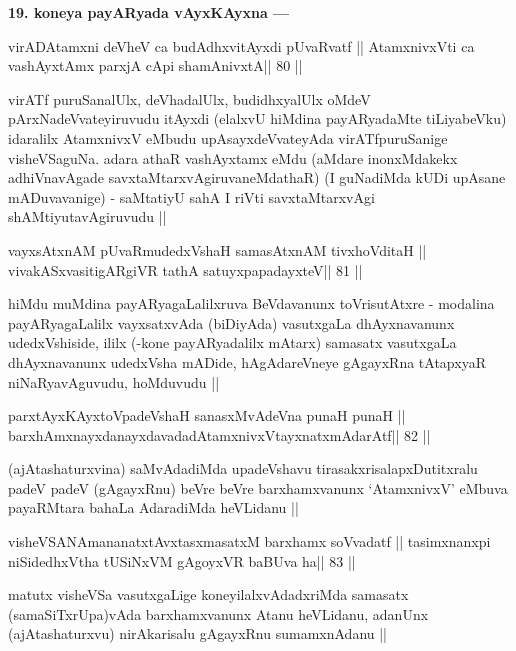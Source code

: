 \begin{artha}
{\bf 19. koneya payARyada vAyxKAyxna ---}
\end{artha} 

\begin{shl}
virADAtamxni deVheV ca budAdhxvitAyxdi pUvaRvatf ||
AtamxnivxVti ca vashAyxtAmx parxjA cApi shamAnivxtA\hfill || 80 ||
\end{shl}

\begin{artha}
virATf puruSanalUlx, deVhadalUlx, budidhxyalUlx oMdeV 
pArxNadeVvateyiruvudu itAyxdi (elalxvU hiMdina payARyadaMte 
tiLiyabeVku) idaralilx AtamxnivxV eMbudu upAsayxdeVvateyAda 
virATfpuruSanige visheVSaguNa. adara athaR vashAyxtamx eMdu (aMdare 
inonxMdakekx adhiVnavAgade savxtaMtarxvAgiruvaneMdathaR) (I guNadiMda kUDi upAsane mADuvavanige) - saMtatiyU sahA I riVti savxtaMtarxvAgi shAMtiyutavAgiruvudu ||
\end{artha}

\begin{shl}
vayxsAtxnAM pUvaRmudedxVshaH samasAtxnAM tivxhoVditaH ||
vivakASxvasitigARgiVR tathA satuyxpapadayxteV\hfill || 81 ||
\end{shl}

\begin{artha}
hiMdu muMdina payARyagaLalilxruva BeVdavanunx toVrisutAtxre - modalina 
payARyagaLalilx vayxsatxvAda (biDiyAda) vasutxgaLa dhAyxnavanunx 
udedxVshiside, ililx (-kone payARyadalilx mAtarx) samasatx vasutxgaLa dhAyxnavanunx udedxVsha mADide, hAgAdareVneye gAgayxRna tAtapxyaR niNaRyavAguvudu, hoMduvudu ||
\end{artha}

\begin{shl}
parxtAyxKAyxtoVpadeVshaH sanasxMvAdeVna punaH punaH ||
barxhAmxnayxdanayxdavadadAtamxnivxVtayxnatxmAdarAtf\hfill || 82 ||
\end{shl}

\begin{artha}
(ajAtashaturxvina) saMvAdadiMda upadeVshavu tirasakxrisalapxDutitxralu padeV padeV (gAgayxRnu) beVre beVre barxhamxvanunx `AtamxnivxV' eMbuva payaRMtara bahaLa AdaradiMda heVLidanu ||
\end{artha}

\begin{shl}
visheVSANAmananatxtAvxtasxmasatxM barxhamx soV\s vadatf ||
tasimxnanxpi niSidedhxV\s tha tUSiNxVM gAgoyxVR baBUva ha\hfill || 83 ||
\end{shl}

\begin{artha}
matutx visheVSa vasutxgaLige koneyilalxvAdadxriMda samasatx 
(samaSiTxrUpa)vAda barxhamxvanunx Atanu heVLidanu, adanUnx (ajAtashaturxvu) nirAkarisalu gAgayxRnu sumamxnAdanu ||
\end{artha}

